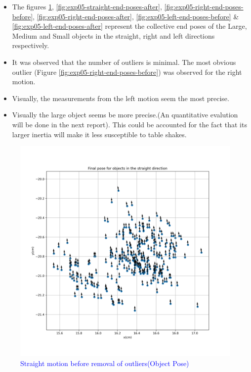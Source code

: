     \begin{itemize}
        \item The figures \ref{fig:exp05-straight-end-poses-before}, \ref{fig:exp05-straight-end-poses-after},
        \ref{fig:exp05-right-end-poses-before}, \ref{fig:exp05-right-end-poses-after}, \ref{fig:exp05-left-end-poses-before} \& \ref{fig:exp05-left-end-poses-after} represent the collective end poses of the Large, Medium and Small objects in the straight, right and left directions respectively. 
        \item It was observed that the number of outliers is minimal. The most obvious outlier (Figure \ref{fig:exp05-right-end-poses-before}) was observed for the right motion.
        \item Visually, the measurements from the left motion seem the most precise. 
        \item Visually the large object seems be more precise.(An quantitative evalution will be done in the next report). This could be accounted for the fact that its larger inertia will make it less susceptible to table shakes.
    \end{itemize}
        
    
    \clearpage
    
      \begin{figure}[H] 
                \centering
                 \includegraphics[width=\textwidth]{"images/experiment_5/Final_pose_for_objects_in_the_straight_direction.png"}
                \caption{\textcolor{blue}{Straight motion before removal of outliers(Object Pose)}}
                \label{fig:exp05-straight-end-poses-before}
      \end{figure}
      
